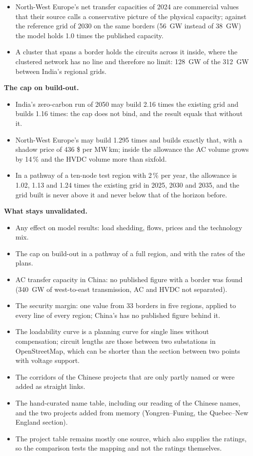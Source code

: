 \begin{itemize}[nosep,leftmargin=*]
  \item North-West Europe's net transfer capacities of 2024 are commercial values that their source calls a conservative picture of the physical capacity; against the reference grid of 2030 on the same borders (\SI{56}{GW} instead of \SI{38}{GW}) the model holds 1.0 times the published capacity.
  \item A cluster that spans a border holds the circuits across it inside, where the clustered network has no line and therefore no limit: \SI{128}{GW} of the \SI{312}{GW} between India's regional grids.
\end{itemize}

\textbf{The cap on build-out.}
\begin{itemize}[nosep,leftmargin=*]
  \item India's zero-carbon run of 2050 may build 2.16 times the existing grid and builds 1.16 times: the cap does not bind, and the result equals that without it.
  \item North-West Europe's may build 1.295 times and builds exactly that, with a shadow price of 436 \$ per MW\,km; inside the allowance the AC volume grows by 14\,\% and the HVDC volume more than sixfold.
  \item In a pathway of a ten-node test region with 2\,\% per year, the allowance is 1.02, 1.13 and 1.24 times the existing grid in 2025, 2030 and 2035, and the grid built is never above it and never below that of the horizon before.
\end{itemize}

\textbf{What stays unvalidated.}
\begin{itemize}[nosep,leftmargin=*]
  \item Any effect on model results: load shedding, flows, prices and the technology mix.
  \item The cap on build-out in a pathway of a full region, and with the rates of the plans.
  \item AC transfer capacity in China: no published figure with a border was found (\SI{340}{GW} of west-to-east transmission, AC and HVDC not separated).
  \item The security margin: one value from 33 borders in five regions, applied to every line of every region; China's has no published figure behind it.
  \item The loadability curve is a planning curve for single lines without compensation; circuit lengths are those between two substations in OpenStreetMap, which can be shorter than the section between two points with voltage support.
  \item The corridors of the Chinese projects that are only partly named or were added as straight links.
  \item The hand-curated name table, including our reading of the Chinese names, and the two projects added from memory (Yongren--Funing, the Quebec--New England section).
  \item The project table remains mostly one source, which also supplies the ratings, so the comparison tests the mapping and not the ratings themselves.
\end{itemize}

